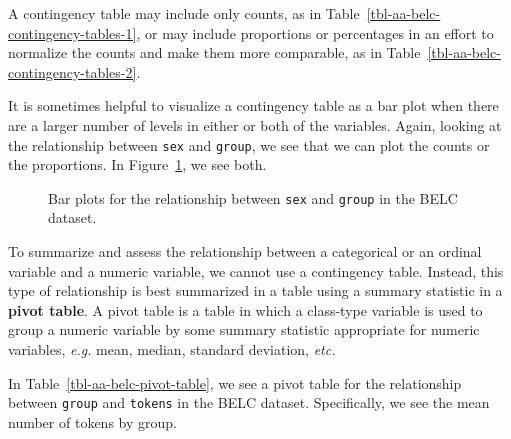 \documentclass[
  letterpaper,
  DIV=11,
  numbers=noendperiod]{scrreprt}
\theoremstyle{definition}
\theoremstyle{remark}
\begin{document}
A contingency table may include only counts, as in
Table~\ref{tbl-aa-belc-contingency-tables-1}, or may include proportions
or percentages in an effort to normalize the counts and make them more
comparable, as in Table~\ref{tbl-aa-belc-contingency-tables-2}.

It is sometimes helpful to visualize a contingency table as a bar plot
when there are a larger number of levels in either or both of the
variables. Again, looking at the relationship between \texttt{sex} and
\texttt{group}, we see that we can plot the counts or the proportions.
In Figure~\ref{fig-aa-belc-bar-plots}, we see both.

\begin{figure}[H]

\begin{minipage}{0.50\linewidth}



\end{minipage}%
%
\begin{minipage}{0.50\linewidth}



\end{minipage}%

\caption{\label{fig-aa-belc-bar-plots}Bar plots for the relationship
between \texttt{sex} and \texttt{group} in the BELC dataset.}

\end{figure}%

To summarize and assess the relationship between a categorical or an
ordinal variable and a numeric variable, we cannot use a contingency
table. Instead, this type of relationship is best summarized in a table
using a summary statistic in a \textbf{pivot table}. A pivot table is a
table in which a class-type variable is used to group a numeric variable
by some summary statistic appropriate for numeric variables, \emph{e.g.}
mean, median, standard deviation, \emph{etc.}

In Table~\ref{tbl-aa-belc-pivot-table}, we see a pivot table for the
relationship between \texttt{group} and \texttt{tokens} in the BELC
dataset. Specifically, we see the mean number of tokens by group.
\end{document}
